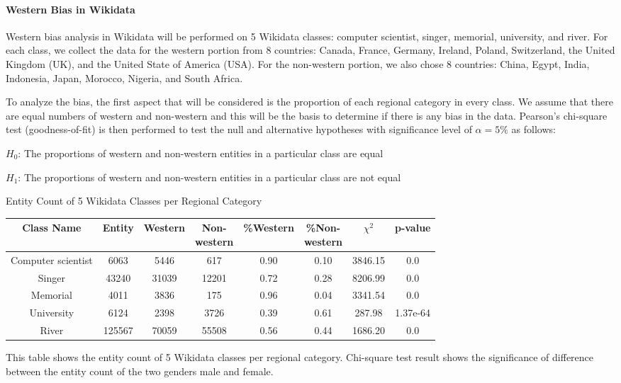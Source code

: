 \paragraph{Western Bias in Wikidata}

Western bias analysis in Wikidata will be performed on 5 Wikidata classes: computer scientist, singer, memorial, university, and river. For each class, we collect the data for the western portion from 8 countries: Canada, France, Germany, Ireland, Poland, Switzerland, the United Kingdom (UK), and the United State of America (USA). For the non-western portion, we also chose 8 countries: China, Egypt, India, Indonesia, Japan, Morocco, Nigeria, and South Africa.

To analyze the bias, the first aspect that will be considered is the proportion of each regional category in every class. We assume that there are equal numbers of western and non-western and this will be the basis to determine if there is any bias in the data. Pearson's chi-square test (goodness-of-fit) is then performed to test the null and alternative hypotheses with significance level of \(\alpha=5\%\) as follows:

\(H_0\): The proportions of western and non-western entities in a particular class are equal

\(H_1\): The proportions of western and non-western entities in a particular class are not equal


\begin{center}
\small
\begin{threeparttable}
\caption{Entity Count of 5 Wikidata Classes per Regional Category}
\label{tab:western - entity count}
\begin{tabular}{c | c c c c c c c} 

\toprule
    Class Name & Entity & Western & \CellWithForceBreak{Non- \\ western} & \%Western & \CellWithForceBreak{\%Non- \\ western}& $\chi^2$ & p-value \\ [0.5ex] 
\midrule
    Computer scientist & 6063 & 5446 & 617 & 0.90 & 0.10 & 3846.15 & 0.0 \\
    Singer & 43240 & 31039 & 12201 & 0.72 & 0.28 & 8206.99 & 0.0 \\
    Memorial & 4011 & 3836 & 175 & 0.96 & 0.04 & 3341.54 & 0.0 \\
    University & 6124 & 2398 & 3726 & 0.39 & 0.61 & 287.98 & 1.37e-64 \\
    River & 125567 & 70059 & 55508 & 0.56 & 0.44 & 1686.20 & 0.0 \\
    [1ex]
\bottomrule
\end{tabular}
\begin{tablenotes}
    \footnotesize
    \item{This table shows the entity count of 5 Wikidata classes per regional category. Chi-square test result shows the significance of difference between the entity count of the two genders male and female.}
\end{tablenotes}
\end{threeparttable}
\end{center}


